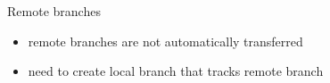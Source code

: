 \begin{frame}{Remote branches}
\footnotesize

\begin{itemize}
 \item remote branches are not automatically transferred
 \item need to create local branch that tracks remote branch
\end{itemize}


\begin{block}{}
\begin{semiverbatim}





\end{semiverbatim}
\end{block}


\end{frame}
